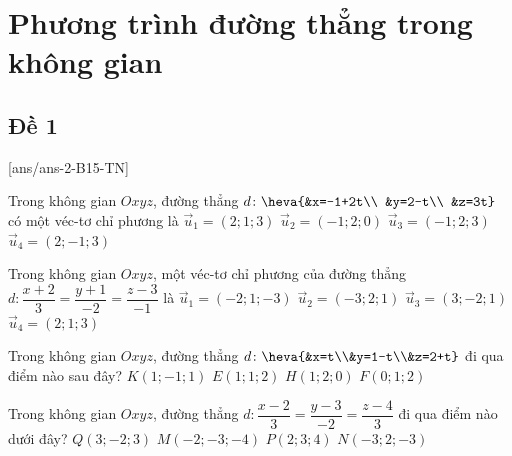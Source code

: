 \section{Phương trình đường thẳng trong không gian}
\subsection{Đề 1}
[ans/ans-2-B15-TN]
\caulc
\begin{ex}%
Trong không gian $Oxyz$, đường thẳng $d\colon \heva{&x=-1+2t\\ &y=2-t\\ &z=3t}$ có một véc-tơ chỉ phương là
\choice
{$\overrightarrow{u}_1=(2;1;3)$}
{$\overrightarrow{u}_2=(-1;2;0)$}
{$\overrightarrow{u}_3=(-1;2;3)$}
{\True $\overrightarrow{u}_4=(2;-1;3)$}
\end{ex}

\begin{ex}%
Trong không gian $Oxyz$, một véc-tơ chỉ phương của đường thẳng $d\colon \dfrac{x+2}{3}=\dfrac{y+1}{-2}=\dfrac{z-3}{-1}$ là
\choice
{$\overrightarrow{u}_1=(-2;1;-3)$}
{\True $\overrightarrow{u}_2=(-3;2;1)$}
{$\overrightarrow{u}_3=(3;-2;1)$}
{$\overrightarrow{u}_4=(2;1;3)$}
\end{ex}

\begin{ex}%
Trong không gian $Oxyz$, đường thẳng $d\colon \heva{&x=t\\&y=1-t\\&z=2+t}$ đi qua điểm nào sau đây?
\choice
{$K(1;-1;1)$}
{$E(1;1;2)$}
{$H(1;2;0)$}
{\True $F(0;1;2)$}
\end{ex}

\begin{ex}%
Trong không gian $Oxyz$, đường thẳng $d\colon\dfrac{x-2}{3}=\dfrac{y-3}{-2}=\dfrac{z-4}{3}$ đi qua điểm nào dưới đây?
\choice
{$Q(3;-2;3)$}
{$M(-2;-3;-4)$}
{\True $P(2;3;4)$}
{$N(-3;2;-3)$}
\end{ex}

